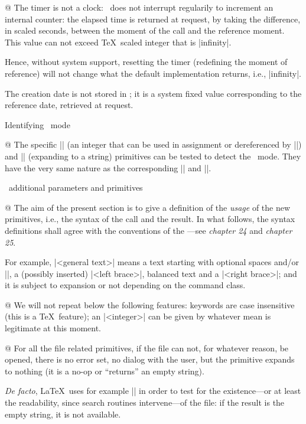 @ The timer is not a clock: \Prote\ does not interrupt regularily to
increment an internal counter: the elapsed time is returned at request,
by taking the difference, in scaled seconds, between the moment of the
call and the reference moment. This value can not exceed \TeX\ scaled
integer that is |infinity|.

Hence, without system support, resetting the timer (redefining the
moment of reference) will not change what the default implementation
returns, i.e., |infinity|.

The creation date is not stored in \Prote; it is a system fixed value
corresponding to the reference date, retrieved at request.

\enddiv %

\enddiv %

\begindiv Identifying \Prote\ mode

@ The specific |\Proteversion| (an integer that can be used in
assignment or dereferenced by |\the|) and |\Proterevision| (expanding to
a string) primitives can be tested to detect the \Prote\ mode. They
have the very same nature as the corresponding |\eTeXversion| and
|\eTeXrevision|.

\enddiv %

\begindiv \Prote\ additional parameters and primitives

@ The aim of the present section is to give a definition of the {\sl
usage} of the new primitives, i.e., the syntax of the call and the
result. In what follows, the syntax definitions shall agree with the
conventions of the \TeXbook---see {\sl chapter 24} and {\sl chapter 25}.

For example, |<general text>| means a text starting with optional
spaces and/or |\relax|, a (possibly inserted) |<left brace>|,
balanced text and a |<right brace>|; and it is subject to expansion
or not depending on the command class.

@ We will not repeat below the following features: keywords are case
insensitive (this is a \TeX\ feature); an |<integer>| can be given by
whatever mean is legitimate at this moment.

@ For all the file related primitives, if the file can not, for whatever
reason, be opened, there is no error set, no dialog with the user, but
the primitive expands to nothing (it is a no-op or ``returns'' an empty
string).

{\it De facto}, La\TeX\ uses for example |\filesize| in order to test
for the existence---or at least the readability, since search routines
intervene---of the file: if the result is the empty string, it is not
available.

